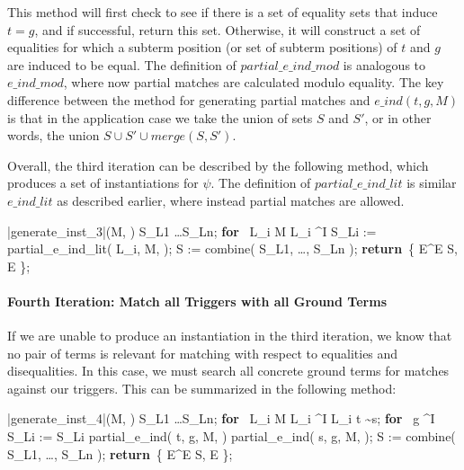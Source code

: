 \documentclass{llncs}
\def\RETURN{\keyword{return}\ }
\def\ENDPROC{\untab}
\def\DOFOR{\qtab\keyword{for}\ }
\def\ENDFOR{\untab}
\def\keyword#1{\mbox{\normalshape\bf #1}}
\begin{document}
This method will first check to see if there is a set of equality sets that induce $t = g$, and if successful, return this set.
Otherwise, it will construct a set of equalities for which a subterm position (or set of subterm positions) of $t$ and $g$ are induced to be equal.
The definition of $partial\_e\_ind\_mod$ is analogous to $e\_ind\_mod$, where now partial matches are calculated modulo equality.
The key difference between the method for generating partial matches and $e\_ind( t, g, M )$ is that in the application case we take the union of sets $S$ and $S'$, or in other words, the union $S \cup S' \cup merge( S, S' )$.

Overall, the third iteration can be described by the following method, which produces a set of instantiations for $\psi$.
The definition of $partial\_e\_ind\_lit$ is similar $e\_ind\_lit$ as described earlier, where instead partial matches are allowed.

\begin{minipage}[t]{.4\linewidth}
\begin{program}
\PROC |generate\_inst_3|(M, \psi) \BODY
S_{L1} \ldots S_{Ln};
\DOFOR {} L_i \in M  L_i \mapsto^I \psi
  S_{Li} := partial\_e\_ind\_lit( L_i, M, \psi );
\ENDFOR
S := combine( S_{L1}, \ldots, S_{Ln} );
\RETURN \{ E^\varepsilon \mid E \in S, E  \};
\ENDPROC
\end{program}
\end{minipage}

\paragraph{Fourth Iteration: Match all Triggers with all Ground Terms}

If we are unable to produce an instantiation in the third iteration, we know that no pair of terms is relevant for matching with respect to equalities and disequalities.
In this case, we must search all concrete ground terms for matches against our triggers.
This can be summarized in the following method:

\begin{minipage}[t]{.4\linewidth}
\begin{program}
\PROC |generate\_inst_4|(M, \psi) \BODY
S_{L1} \ldots S_{Ln};
\DOFOR {} L_i \in M  L_i \mapsto^I \psi
  L_i  t \sim s;
  \DOFOR {} g \mapsto^I \emptyset
    S_{Li} := S_{Li} \cup partial\_e\_ind( t, g, M, \psi ) \cup partial\_e\_ind( s, g, M, \psi );
  \ENDFOR
\ENDFOR
S := combine( S_{L1}, \ldots, S_{Ln} );
\RETURN \{ E^\varepsilon \mid E \in S, E  \};
\ENDPROC
\end{program}
\end{minipage}
\end{document}
